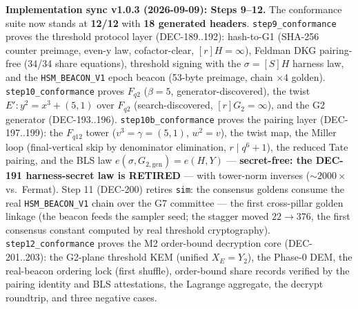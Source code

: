 \documentclass[11pt, a4paper]{article}
\begin{document}
\textbf{Implementation sync v1.0.3 (2026-09-09): Steps 9--12.} The conformance
suite now stands at \textbf{12/12} with \textbf{18 generated headers}.
\texttt{step9\_conformance} proves the threshold protocol layer (DEC-189..192): hash-to-G1
(SHA-256 counter preimage, even-y law, cofactor-clear, $[r]H=\infty$), Feldman DKG
pairing-free (34/34 share equations), threshold signing with the $\sigma = [S]H$ harness
law, and the \texttt{HSM\_BEACON\_V1} epoch beacon (53-byte preimage, chain $\times$4
golden). \texttt{step10\_conformance} proves $F_{q2}$ ($\beta{=}5$, generator-discovered),
the twist $E': y^2 = x^3 + (5,1)$ over $F_{q2}$ (search-discovered, $[r]G_2=\infty$), and
the G2 generator (DEC-193..196). \texttt{step10b\_conformance} proves the pairing layer
(DEC-197..199): the $F_{q12}$ tower ($v^3 = \gamma = (5,1)$, $w^2 = v$), the twist map,
the Miller loop (final-vertical skip by denominator elimination, $r \mid q^6{+}1$), the
reduced Tate pairing, and the BLS law $e(\sigma, G_{2,\mathrm{gen}}) = e(H, Y)$ ---
\textbf{secret-free: the DEC-191 harness-secret law is RETIRED} --- with tower-norm
inverses (${\sim}2000\times$ vs.\ Fermat). Step 11 (DEC-200) retires
\texttt{sim\beacon}: the consensus goldens consume the real \texttt{HSM\_BEACON\_V1}
chain over the G7 committee --- the first cross-pillar golden linkage (the beacon feeds
the sampler seed; the stagger moved $22 \to 376$, the first consensus constant computed
by real threshold cryptography). \texttt{step12\_conformance} proves the M2 order-bound
decryption core (DEC-201..203): the G2-plane threshold KEM (unified $X_E = Y_2$), the
Phase-0 DEM, the real-beacon ordering lock (first shuffle), order-bound share records
verified by the pairing identity and BLS attestations, the Lagrange aggregate, the
decrypt roundtrip, and three negative cases.
\end{document}
